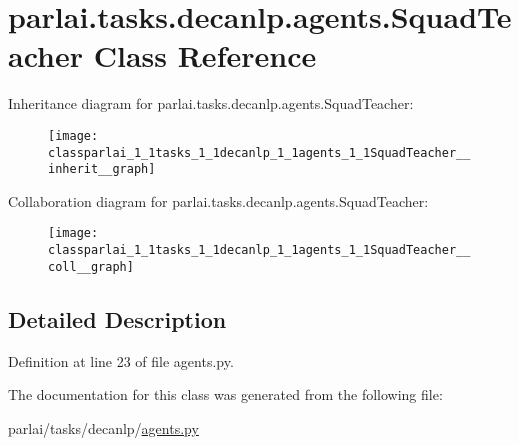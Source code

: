 \hypertarget{classparlai_1_1tasks_1_1decanlp_1_1agents_1_1SquadTeacher}{}\section{parlai.\+tasks.\+decanlp.\+agents.\+Squad\+Teacher Class Reference}
\label{classparlai_1_1tasks_1_1decanlp_1_1agents_1_1SquadTeacher}


Inheritance diagram for parlai.\+tasks.\+decanlp.\+agents.\+Squad\+Teacher\+:
\nopagebreak
\begin{figure}[H]
\begin{center}
\leavevmode
\texttt{[image: classparlai\_1\_1tasks\_1\_1decanlp\_1\_1agents\_1\_1SquadTeacher\_\_inherit\_\_graph]}
\end{center}
\end{figure}


Collaboration diagram for parlai.\+tasks.\+decanlp.\+agents.\+Squad\+Teacher\+:
\nopagebreak
\begin{figure}[H]
\begin{center}
\leavevmode
\texttt{[image: classparlai\_1\_1tasks\_1\_1decanlp\_1\_1agents\_1\_1SquadTeacher\_\_coll\_\_graph]}
\end{center}
\end{figure}


\subsection{Detailed Description}


Definition at line 23 of file agents.\+py.



The documentation for this class was generated from the following file\+:\begin{DoxyCompactItemize}
\item 
parlai/tasks/decanlp/\hyperlink{parlai_2tasks_2decanlp_2agents_8py}{agents.\+py}\end{DoxyCompactItemize}
